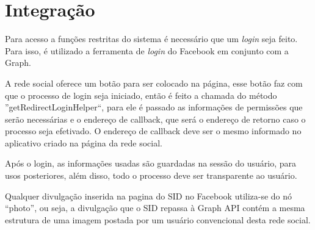 


\section{Integração}
Para acesso a funções restritas do sistema é necessário que um \textit{login} seja feito. Para isso, é utilizado a ferramenta de \textit{login} do Facebook em conjunto com a Graph. 

A rede social oferece um botão para ser colocado na página, esse botão faz com que o processo de login seja iniciado, então é feito a chamada do método ''getRedirectLoginHelper``, para ele é passado as informações de permissões que serão necessárias e o endereço de callback, que será o endereço de retorno caso o processo seja efetivado. O endereço de callback deve ser o mesmo informado no aplicativo criado na página da rede social.

Após o login, as informações usadas são guardadas na sessão do usuário, para usos posteriores, além disso, todo o processo deve ser transparente ao usuário. 

Qualquer divulgação inserida na pagina do SID no Facebook utiliza-se do nó “photo”, ou seja, a divulgação que o SID repassa à Graph API contém a mesma estrutura de uma imagem postada por um usuário convencional desta rede social. 

